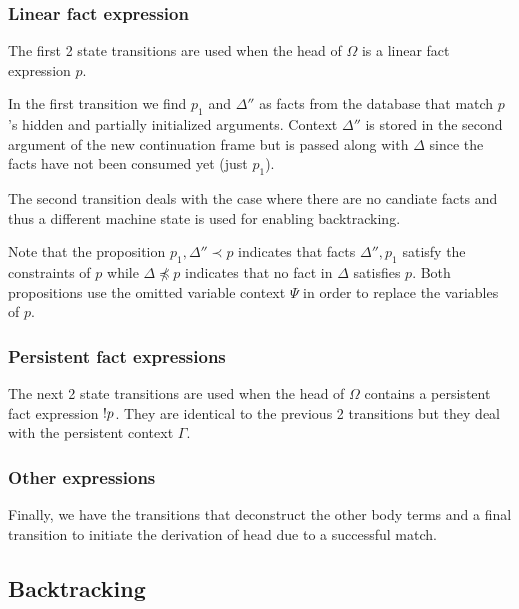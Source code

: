 \subsubsection{Linear fact expression}

The first 2 state transitions are used when the head of $\Omega$ is a linear fact
expression $p$.

In the first transition we find $p_1$ and $\Delta''$ as facts from the database
that match $p$'s hidden and partially initialized arguments.  Context $\Delta''$
is stored in the second argument of the new continuation frame but is passed
along with $\Delta$ since the facts have not been consumed yet (just $p_1$).

The second transition deals with the case where there are no candiate facts and
thus a different machine state is used for enabling backtracking.

Note that the proposition $p_1, \Delta'' \prec p$ indicates that facts
$\Delta'', p_1$ satisfy the constraints of $p$ while $\Delta \npreceq p$
indicates that no fact in $\Delta$ satisfies $p$. Both propositions use the
omitted variable context $\Psi$ in order to replace the variables of $p$.



\subsubsection{Persistent fact expressions}

The next 2 state transitions are used when the head of $\Omega$ contains a
persistent fact expression ${!} p$. They are identical to the previous 2
transitions but they deal with the persistent context $\Gamma$.



\subsubsection{Other expressions}

Finally, we have the transitions that deconstruct the other body terms and a
final transition to initiate the derivation of head due to a successful match.



\subsection{Backtracking}\label{sec:lld_match_cont}

